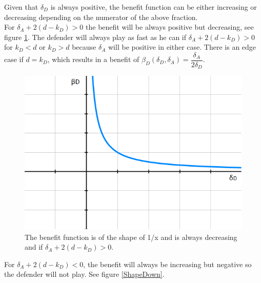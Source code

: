 Given that $\delta_{D}$ is always positive, the benefit function can be either increasing or decreasing depending on the numerator of the above fraction. \\

For $\delta_{A} + 2(d-k_{D}) > 0$ the benefit will be always positive but decreasing, see figure \ref{ShapeUp}. 
The defender will always play as fast as he can if $\delta_{A} + 2(d-k_{D}) > 0$ for $k_{D} < d$ or $k_{D} > d$ because $\delta_{A}$ will be positive in either case. There is an edge case if $d=k_{D}$, which results in a benefit of $\beta_{D}(\delta_{D},\delta_{A})= \dfrac{\delta_{A}}{2\delta_{D}}$. \\
\begin{figure}
\centering
\includegraphics[scale=0.5]{Images/ShapesUp.png} 
\caption{The benefit function is of the shape of 1/x and is always decreasing and if $\delta_{A} + 2(d-k_{D}) > 0$. }
\label{ShapeUp}
\end{figure}

For $\delta_{A} + 2(d-k_{D}) < 0$, the benefit will always be increasing but negative so the defender will not play. See figure \ref{ShapeDown}.  \\

